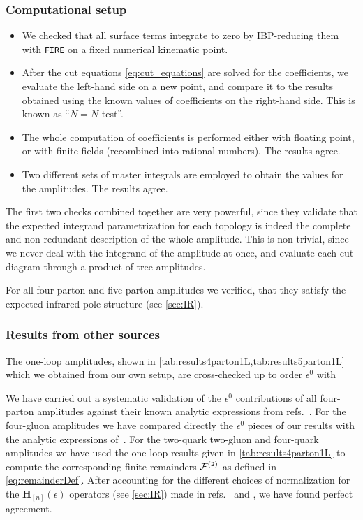 \subsubsection{Computational setup}
\begin{itemize}
  \item We checked that all surface terms integrate to zero by IBP-reducing them with \texttt{FIRE}
\cite{Smirnov:2008iw,Smirnov:2014hma,Smirnov:2019qkx} on a fixed numerical kinematic
point.
\item
After the cut equations \cref{eq:cut_equations} are solved for the coefficients, we evaluate
the left-hand side on a new point, and compare it to the results obtained using the known values of coefficients on the right-hand side.
This is known as ``$N=N$ test''.
\item The whole computation of coefficients is performed either with floating point, or with finite fields (recombined into rational numbers).
  The results agree.
\item Two different sets of master integrals are employed to obtain the values for the amplitudes. The results agree.
\end{itemize}
The first two checks combined together are very powerful, since they validate that the expected
integrand parametrization for each topology is indeed the complete and non-redundant description of the whole amplitude.
This is non-trivial, since we never deal with the integrand of the amplitude at once, and evaluate 
each cut diagram through a product of tree amplitudes.

For all four-parton and five-parton amplitudes we verified,
that they satisfy the
expected infrared pole structure (see \cref{sec:IR}).

\subsubsection{Results from other sources}

The one-loop amplitudes, shown in \cref{tab:results4parton1L,tab:results5parton1L} which we obtained from our own setup,
are cross-checked up to order $\epsilon^0$ with \BlackHat{}~\cite{Berger:2008sj}

We have carried out a systematic
validation of the $\epsilon^0$ contributions of all four-parton amplitudes against their known analytic
expressions from refs.~\cite{Bern:2002tk,Bern:2003ck,DeFreitas:2004kmi,Glover:2004si}. 
For the four-gluon amplitudes we have compared directly the
$\epsilon^0$ pieces of our results with the analytic expressions of~\cite{Bern:2002tk}.
For the two-quark two-gluon and four-quark amplitudes we have used the one-loop results given in \cref{tab:results4parton1L}
to compute the corresponding finite remainders $\mathcal{F}^{(2)}$ as
defined in \cref{eq:remainderDef}. 
After accounting for the different choices of 
normalization for the $\mathbf{H}_{[n]}(\epsilon)$ operators 
(see \cref{sec:IR})
made in refs.~\cite{Bern:2003ck} and \cite{Glover:2004si},
we have found perfect agreement.

